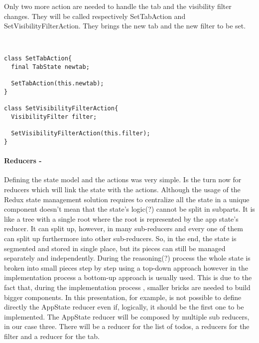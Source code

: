 Only two more action are needed to handle the tab and the visibility filter changes. They will be called respectively  SetTabAction and SetVisibilityFilterAction. They brings the new tab and the new filter to be set.
\begin{code}
\mbox{}\\
 \mbox{}
		\label{code:2.14}
\begin{verbatim}
class SetTabAction{
  final TabState newtab;

  SetTabAction(this.newtab);
}

class SetVisibilityFilterAction{
  VisibilityFilter filter;

  SetVisibilityFilterAction(this.filter);
}
\end{verbatim}
\mbox{}
\end{code}

\paragraph{Reducers - }
\label{subpar:todo_app_bloc_core_state}
Defining the state model and the actions was very simple. Is the turn now for reducers which will link the state with the actions. Although the usage of the Redux state management solution requires to centralize all the state in a unique component doesn’t mean that the state’s logic(?) cannot be split in subparts. It is like a tree with a single root where the root is represented by the app state’s reducer.  It can split up, however, in many sub-reducers and every one of them can split up furthermore into other sub-reducers. So, in the end, the state is segmented and stored in single place, but its pieces can still be managed separately and independently. During the reasoning(?) process the whole state is broken into small pieces step by step using a top-down approach however in the implementation process a bottom-up approach is usually used. This is due to the fact that, during the implementation process , smaller bricks are needed to build bigger components. In this presentation, for example, is not possible to define directly the AppState reducer even if, logically, it should be the first one to be implemented. The AppState reducer will be composed by multiple sub reducers, in our case three. There will be a reducer for the list of todos, a reducers for the filter and a reducer for the tab. 
